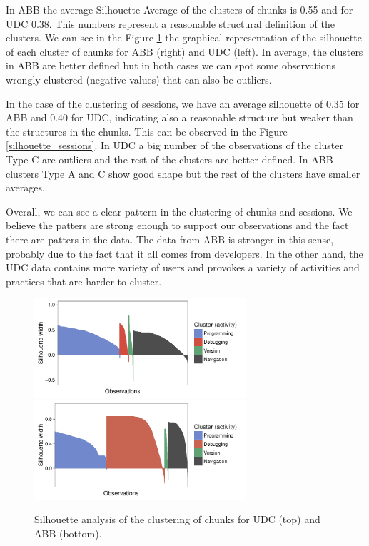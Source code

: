 In ABB the average Silhouette Average of the clusters of chunks is 0.55 and for UDC 0.38. This numbers represent a reasonable structural definition of the clusters. We can see in the Figure \ref{silhouette_chunks} the graphical representation of the silhouette of each cluster of chunks for ABB (right) and UDC (left). In average, the clusters in ABB are better defined but in both cases we can spot some observations wrongly clustered (negative values) that can also be outliers.

In the case of the clustering of sessions, we have an average silhouette of 0.35 for ABB and 0.40 for UDC, indicating also a reasonable structure but weaker than the structures in the chunks. This can be observed in the Figure \ref{silhouette_sessions}. In UDC a big number of the observations of the cluster Type C are outliers and the rest of the clusters are better defined. In ABB clusters Type A and C show good shape but the rest of the clusters have smaller averages.

Overall, we can see a clear pattern in the clustering of chunks and sessions. We believe the patters are strong enough to support our observations and the fact there are patters in the data. The data from ABB is stronger in this sense, probably due to the fact that it all comes from developers. In the other hand, the UDC data contains more variety of users and provokes a variety of activities and practices that are harder to cluster. 



\begin{figure}[!ht]

	\centering		
	\includegraphics[width=0.7\textwidth]{Figures/UDC_silhouette_chunks}
	\includegraphics[width=0.7\textwidth]{Figures/ABB_silhouette_chunks}	
	\caption{Silhouette analysis of the clustering of chunks for UDC (top) and ABB (bottom).}
		\label{silhouette_chunks}
\end{figure}


